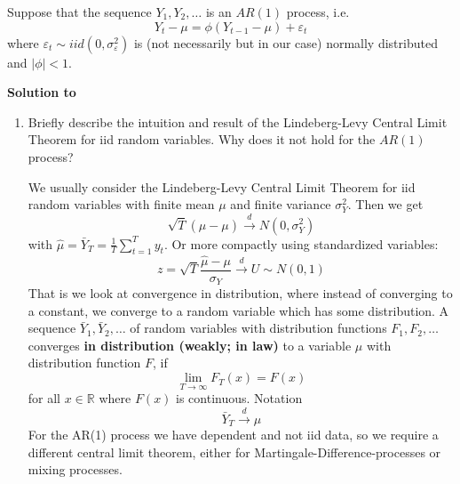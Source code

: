 Suppose that the sequence $Y_{1},Y_{2},\ldots $ is an $AR(1)$ process, i.e.
$$Y_{t}-\mu =\phi \left(Y_{t-1}-\mu\right) +\varepsilon _{t}$$ where $\varepsilon _{t}\sim iid(0,\sigma _{\varepsilon }^{2})$ is (not necessarily but in our case) normally distributed and $|\phi |<1$.
\begin{solution}\textbf{Solution to }\end{solution}
\begin{enumerate}
    \item Briefly describe the intuition and result of the Lindeberg-Levy Central Limit Theorem for iid random variables. Why does it not hold for the $AR(1)$ process?
          \begin{solution}
              We usually consider the Lindeberg-Levy Central Limit Theorem for iid random variables with finite mean $\mu$ and finite variance $\sigma_Y^2$. Then we get $$\sqrt{T} (\hat{\mu}-\mu) \overset{d}{\rightarrow} N(0,\sigma_Y^2)$$ with $\hat{\mu} = \bar{Y}_T = \frac{1}{T} \sum_{t=1}^T y_t$. Or more compactly using standardized variables: $$z = \sqrt{T}\frac{\hat{\mu}-\mu}{\sigma_Y}\overset{d}{\rightarrow} U \sim N(0,1)$$
              That is we look at convergence in distribution, where instead of converging to a constant, we converge to a random variable which has some distribution. A sequence $\bar{Y}_{1},\bar{Y}_{2},\ldots $ of random variables with distribution functions $F_{1},F_{2},\ldots $ converges \textbf{in distribution (weakly; in law)} to a variable $\mu$ with distribution function $F$, if
              \begin{equation*}
                  \lim_{T\rightarrow \infty }F_{T}(x)=F(x)
              \end{equation*}
              for all $x\in \mathbb{R}$ where $F(x)$ is continuous. Notation
              \begin{equation*}
                  \bar{Y}_{T}\overset{d}{\rightarrow }\mu
              \end{equation*}
              For the AR(1) process we have dependent and not iid data, so we require a different central limit theorem, either for Martingale-Difference-processes or mixing processes.


\end{solution}
\end{enumerate}
